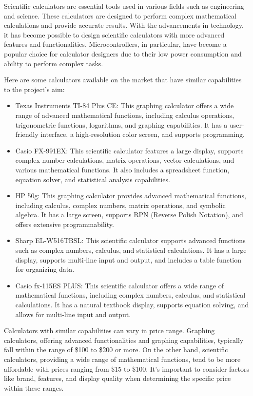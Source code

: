 \documentclass[a4paper, twoside]{report}
\begin{document}
Scientific calculators are essential tools used in various fields such as engineering and science. These calculators are designed to perform complex mathematical calculations and provide accurate results. With the advancements in technology, it has become possible to design scientific calculators with more advanced features and functionalities. Microcontrollers, in particular, have become a popular choice for calculator designers due to their low power consumption and ability to perform complex tasks.

Here are some calculators available on the market that have similar capabilities to the project's aim:
\begin{itemize}
    \item Texas Instruments TI-84 Plus CE: This graphing calculator offers a wide range of advanced mathematical functions, including calculus operations, trigonometric functions, logarithms, and graphing capabilities. It has a user-friendly interface, a high-resolution color screen, and supports programming.
    \item Casio FX-991EX: This scientific calculator features a large display, supports complex number calculations, matrix operations, vector calculations, and various mathematical functions. It also includes a spreadsheet function, equation solver, and statistical analysis capabilities.
    \item HP 50g: This graphing calculator provides advanced mathematical functions, including calculus, complex numbers, matrix operations, and symbolic algebra. It has a large screen, supports RPN (Reverse Polish Notation), and offers extensive programmability.
    \item Sharp EL-W516TBSL: This scientific calculator supports advanced functions such as complex numbers, calculus, and statistical calculations. It has a large display, supports multi-line input and output, and includes a table function for organizing data.
    \item Casio fx-115ES PLUS: This scientific calculator offers a wide range of mathematical functions, including complex numbers, calculus, and statistical calculations. It has a natural textbook display, supports equation solving, and allows for multi-line input and output.
\end{itemize}

Calculators with similar capabilities can vary in price range. Graphing calculators, offering advanced functionalities and graphing capabilities, typically fall within the range of \$100 to \$200 or more. On the other hand, scientific calculators, providing a wide range of mathematical functions, tend to be more affordable with prices ranging from \$15 to \$100. It's important to consider factors like brand, features, and display quality when determining the specific price within these ranges.
\end{document}
